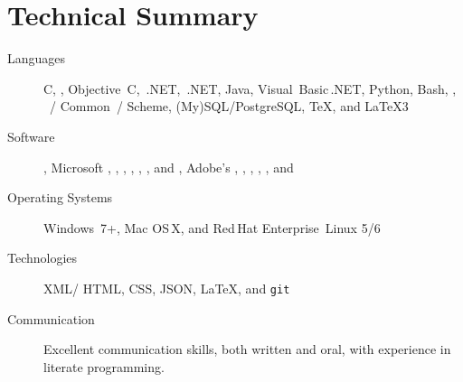 \documentclass{simplecv}
\begin{document}
\maketitle
\vfill
\section{Technical Summary}
\begin{minipage}{\textwidth}
\begin{description}
\item[Languages]
  C,
  \CPP,
  Objective~C,
  \CPP\,.NET,
  \CSharp\,.NET,
  Java,
  Visual~Basic\,.NET,
  Python,
  Bash,
  ,
  ~\Lisp\slash
            Common~\Lisp\slash
            Scheme,
  (My)SQL\slash PostgreSQL,
  \TeX,
  and
  \LaTeX3

\item[Software]
  ,
  Microsoft ,
            ,
            ,
            ,
            ,
            ,
            and
            ,
  Adobe's
    ,
    ,
    ,
  ,
  ,
  and

\item[Operating Systems]
  Windows~7+,
  Mac OS\,X,
  and
  Red\,Hat Enterprise~Linux 5\slash 6

\item[Technologies]
  XML\slash
  HTML,
  CSS,
  JSON,
  \LaTeX,
  and
  \texttt{git}

\item[Communication]
  Excellent communication skills, both written and oral,
    with experience in literate programming.
\end{description}
\end{minipage}

\vfill
\end{document}
